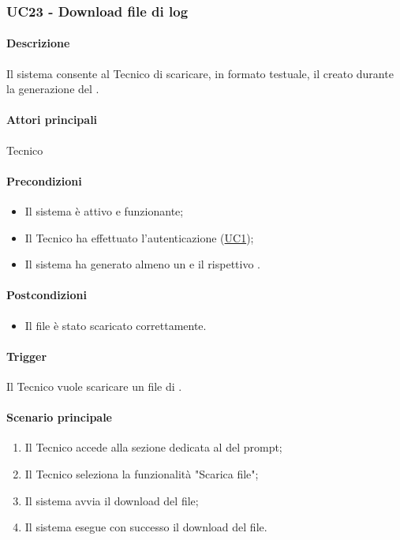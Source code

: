 \subsubsection{UC23 - Download file di log}\label{UC23}
\paragraph*{Descrizione}
Il sistema consente al Tecnico di scaricare, in formato testuale, il  creato durante la generazione del .

\paragraph*{Attori principali}
Tecnico

\paragraph*{Precondizioni}
\begin{itemize}
  \item Il sistema è attivo e funzionante;
  \item Il Tecnico ha effettuato l'autenticazione (\hyperref[UC1]{UC1});
  \item Il sistema ha generato almeno un  e il rispettivo .
\end{itemize}

\paragraph*{Postcondizioni}
\begin{itemize}
  \item Il file è stato scaricato correttamente.
\end{itemize}

\paragraph*{Trigger}
Il Tecnico vuole scaricare un file di .

\paragraph*{Scenario principale}
\begin{enumerate}
  \item Il Tecnico accede alla sezione dedicata al  del prompt;
  \item Il Tecnico seleziona la funzionalità "Scarica file";
  \item Il sistema avvia il download del file;
  \item Il sistema esegue con successo il download del file.
\end{enumerate}

